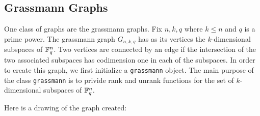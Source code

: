 \subsection{Grassmann Graphs}












One class of graphs are the grassmann graphs. 
Fix $n,k,q$ where $k \le n$ and $q$ is a prime power. The grassmann graph $G_{n,k,q}$ has as its vertices the 
$k$-dimensional subspaces of ${\mathbb F}_q^n$. Two vertices are connected by an edge if the intersection of the two 
associated subspaces has codimension one in each of the subspaces. 
In order to create this graph, we first initialize a \verb'grassmann' object. 
The main purpose of the class \verb'grassmann' is to privide rank and unrank functions 
for the set of $k$-dimensional subspaces of ${\mathbb F}_q^n.$  

{\small
{\tt

}
}



%

Here is a drawing of the graph created:
$$

$$



